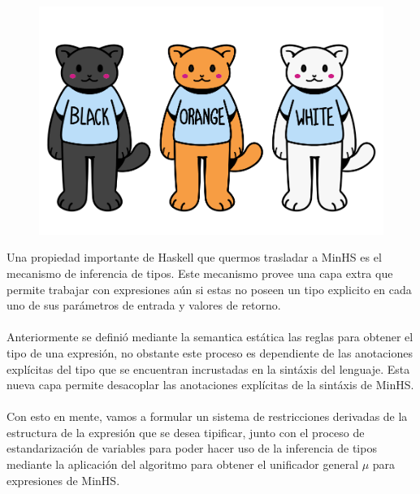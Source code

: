 
\begin{figure}[htbp]
    \centerline{\includegraphics[scale=0.5]{assets/gatitos_tipados.PNG}}       
\end{figure}

Una propiedad importante de \textsf{Haskell} que quermos trasladar a \textsf{MinHS} es el mecanismo de inferencia de tipos. Este mecanismo provee una capa extra que permite trabajar con expresiones aún si estas no poseen un tipo explicito en cada uno de sus parámetros de entrada y valores de retorno. \\\\
Anteriormente se definió mediante la semantica estática las reglas para obtener el tipo de una expresión, no obstante este proceso es dependiente de las anotaciones explícitas del tipo que se encuentran incrustadas en la sintáxis del lenguaje.
Esta nueva capa permite desacoplar las anotaciones explícitas de la sintáxis de \textsf{MinHS}.\\\\
Con esto en mente, vamos a formular un sistema de restricciones derivadas de la estructura de la expresión que se desea tipificar, junto con el proceso de estandarización de variables para poder hacer uso de la inferencia de tipos mediante la aplicación del algoritmo para obtener el unificador general $\mu$ para expresiones de \textsf{MinHS}.\\

